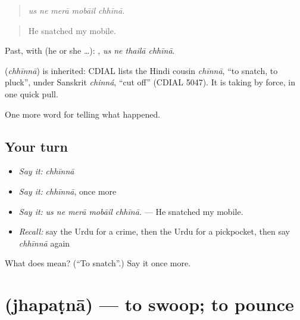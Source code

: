 \begin{quote}
    
\end{quote}

\begin{quote}
\emph{us ne merā mobāil chhīnā.}
\end{quote}

\begin{quote}
He snatched my mobile.
\end{quote}

Past, with  (he or she …):    , \emph{us ne thailā chhīnā}.

\begin{cousinweb}
\textbf{} (\emph{chhīnnā}) is inherited: CDIAL lists the Hindi cousin \emph{chīnnā}, \textquotedblleft{}to snatch, to pluck\textquotedblright{}, under Sanskrit \emph{chinná}, \textquotedblleft{}cut off\textquotedblright{} (CDIAL 5047). It is taking by force, in one quick pull.
\end{cousinweb}

\begin{grammarlens}[title={What you've built}]
One more word for telling what happened.
\end{grammarlens}

\subsection*{Your turn}
\begin{itemize}
\raggedright
  \item \emph{Say it:} \emph{chhīnnā}
  \item \emph{Say it:} \emph{chhīnnā}, once more
  \item \emph{Say it:} \emph{us ne merā mobāil chhīnā.} — He snatched my mobile.
  \item \emph{Recall:} say the Urdu for a crime, then the Urdu for a pickpocket, then say \emph{chhīnnā} again
\end{itemize}

\begin{tcolorbox}[breakable,colback=teal!4,colframe=teal!35!black,title={Before you move on}]
What does  mean? (\textquotedblleft{}To snatch\textquotedblright{}.) Say it once more.
\end{tcolorbox}
\section[\texorpdfstring{\ur{جھپٹنا} (jhapaṭnā)}{جھپٹنا (jhapaṭnā)}]{ (jhapaṭnā) — to swoop; to pounce}

